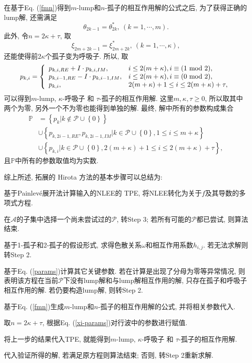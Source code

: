 \documentclass[12pt,a4paper,UTF8]{article}
\numberwithin{equation}{section}
\newcommand{\bbrace}[1]{\left\{#1\right\}}
\newcommand{\ALLP}{\mathcal{A}}
\newcommand{\PS}{\mathcal{P}}
\renewcommand{\mod}{{\rm ~mod~}}
\newcommand{\Painleve}{Painlev{\'e}}
\newcommand{\refeqn}[1]{Eq. (\ref{#1})}
\newcommand{\MLNS}{$m$-lump和$n$-孤子的相互作用解}
\begin{document}
在基于\refeqn{fmn}得到\MLNS{}的公式之后, 为了获得正确的lump解, 还需满足
\begin{equation}
  \theta_{2k-1}=\theta_{2k}^*, ~(k=1,\cdots,m).
\end{equation}
此外, 令$n=2\kappa+\tau$, 取
\begin{equation}
  \xi_{2m+2k-1}=\xi_{2m+2k}^*, ~(k=1,\cdots,\kappa),
\end{equation}
还能使得前$2\kappa$个孤子变为呼吸子. 所以, 取
\begin{equation}
p_{k,i}=\left\{
\begin{array}{ll}
  p_{k,i,RE}+I\cdot p_{k,i,IM}, & i\le 2(m+\kappa), i\equiv(1 \mod 2),\\
  p_{k,i-1,RE}-I\cdot p_{k,i-1,IM}, & i\le 2(m+\kappa), i\equiv(0 \mod 2),\\
  p_{k,i}, & 2(m+\kappa)+1 \le i \le 2(m+\kappa)+\tau ,
\end{array}
\right.
\end{equation}
可以得到$m$-lump, $\kappa$-呼吸子 和 $\tau$-孤子的相互作用解. 这里$m,\kappa,\tau\ge 0$, 所以取其中两个为零, 另外一个不为零也能得到单独的解. 最终, 解中所有的参数构成集合
\begin{equation}
\begin{aligned}
\mathbb{P}
&=\bbrace{p_k|k\not\in \PS\cup\bbrace{0}} \\
&\cup\bbrace{p_{k,2i-1,RE},p_{k,2i-1,IM}|k\in\PS\cup\bbrace{0},1\le i \le m+\kappa} \\
&\cup\bbrace{p_{k,i}|k\in\PS\cup\bbrace{0},2(m+\kappa)+1 \le i \le 2(m+\kappa)+\tau},
\end{aligned}
\label{xi-params}
\end{equation}
且$\mathbb P$中所有的参数取值均为实数. 

综上所述, 拓展的 Hirota 方法的基本步骤可以总结为: 
\begin{compactenum}[Step 1.]
\item 基于\Painleve{}展开法计算输入的NLEE的 TPE, 将NLEE转化为关于$f$及其导数的多项式方程. 
\item 在$\ALLP$的子集中选择一个尚未尝试过的$\PS$, 转Step 3; 若所有可能的$\PS$都已尝试, 则算法结束.
\item 基于1-孤子和2-孤子的假设形式, 求得色散关系$\omega$和相互作用系数$h_{i,j}$. 若无法求解则转Step 2.
\item 基于\refeqn{params}计算其它关键参数. 若在计算是出现了分母为零等异常情况, 则表明该方程在当前$\PS$下没有lump解和与lump解相互作用的解, 只存在孤子和呼吸子相互作用的解. 若仍要构造lump解, 则转Step 2.
\item 基于\refeqn{fmn}生成\MLNS{}的公式, 并将相关参数代入. 
\item 取$n=2\kappa+\tau$, 根据\refeqn{xi-params}对行波中的参数进行赋值.
\item 将上一步的结果代入TPE, 就能得到$m$-lump, $\kappa$-呼吸子 和 $\tau$-孤子的相互作用解.
\item 代入验证所得的解, 若满足原方程则算法结束; 否则, 转Step 2重新求解. 
\end{compactenum}
\end{document}
